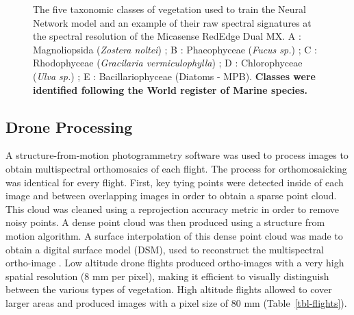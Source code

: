 \documentclass[
  number]{elsarticle}
\begin{document}
\label{cell-fig-vegetation}
\begin{figure}[H]


\caption{\label{fig-vegetation}The five taxonomic classes of vegetation
used to train the Neural Network model and an example of their raw
spectral signatures at the spectral resolution of the Micasense RedEdge
Dual MX. A : Magnoliopsida (\emph{Zostera noltei}) ; B : Phaeophyceae
(\emph{Fucus sp.}) ; C : Rhodophyceae (\emph{Gracilaria
vermiculophylla}) ; D : Chlorophyceae (\emph{Ulva sp.}) ; E :
Bacillariophyceae (Diatoms - MPB). \textbf{Classes were identified
following the World register of Marine species.}}

\end{figure}%

\subsection{Drone Processing}\label{drone-processing}

A structure-from-motion photogrammetry software \citep[Agisoft
Metashape,][]{agisoft} was used to process images to obtain
multispectral orthomosaics of each flight. The process for
orthomosaicking was identical for every flight. First, key tying points
were detected inside of each image and between overlapping images in
order to obtain a sparse point cloud. This cloud was cleaned using a
reprojection accuracy metric in order to remove noisy points. A dense
point cloud was then produced using a structure from motion algorithm. A
surface interpolation of this dense point cloud was made to obtain a
digital surface model (DSM), used to reconstruct the multispectral
ortho-image \citep{nebel2020review}. Low altitude drone flights produced
ortho-images with a very high spatial resolution (8 mm per pixel),
making it efficient to visually distinguish between the various types of
vegetation. High altitude flights allowed to cover larger areas and
produced images with a pixel size of 80 mm (Table~\ref{tbl-flights}).
\end{document}
